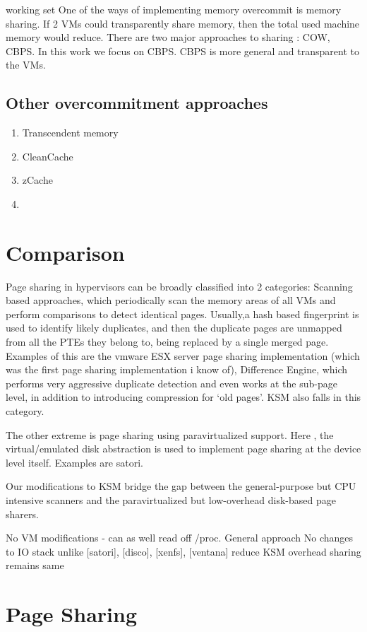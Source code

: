 \documentclass[11pt]{article}
\begin{document}
working set
One of the ways of implementing memory overcommit is memory sharing. If 2 VMs could transparently share memory, then the total used machine memory would reduce.
There are two major approaches to sharing : COW, CBPS. 
In this work we focus on CBPS. CBPS is more general and transparent to the VMs. 
\subsection{Other overcommitment approaches}
\label{sec-3_2}

\begin{enumerate}
\item Transcendent memory
\item CleanCache
\item zCache
\item 
\end{enumerate}
\section{Comparison}
\label{sec-4}

Page sharing in hypervisors can be broadly classified into 2 categories: Scanning based approaches, which periodically scan the memory areas of all VMs and perform comparisons to detect identical pages. 
Usually,a hash based fingerprint is used to identify likely duplicates, and then the duplicate pages are unmapped from all the PTEs they belong to, being replaced by a single merged page.
Examples of this are the vmware ESX server page sharing implementation (which was the first page sharing implementation i know of), Difference Engine, which performs very aggressive duplicate detection and even works at the sub-page level, in addition to introducing compression for `old pages'. KSM also falls in this category.

The other extreme is page sharing using paravirtualized support. Here , the virtual/emulated disk abstraction is used to implement page sharing at the device level itself. Examples are satori.

Our modifications to KSM bridge the gap between the general-purpose but CPU intensive scanners and the paravirtualized but low-overhead disk-based page sharers.



No VM modifications - can as well read off /proc. 
General approach
No changes to IO stack unlike [satori], [disco], [xenfs], [ventana]
reduce KSM overhead
sharing remains same
\section{Page Sharing}
\label{sec-5}
\end{document}

